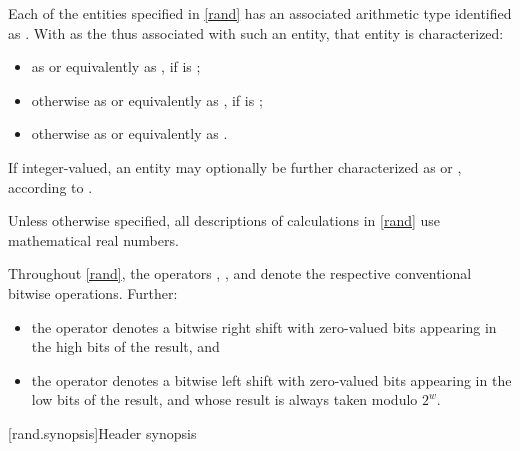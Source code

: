 \pnum
Each of the entities specified in \ref{rand}
has an associated arithmetic type
identified as .
With  as the 
thus associated with such an entity,
that entity is characterized:
\begin{itemize}
 \item
   as  or equivalently as ,
   if  is ;
 \item
   otherwise
   as  or equivalently as ,
   if  is ;
 \item
   otherwise
   as  or equivalently as .
\end{itemize}
\noindent
If integer-valued,
an entity may optionally be further characterized as
 or ,
according to .

\pnum
Unless otherwise specified,
all descriptions of calculations
in \ref{rand}
use mathematical real numbers.

\pnum
Throughout \ref{rand},
the operators
\bitand, \bitor, and \xor{}
denote the respective conventional bitwise operations.
Further:
\begin{itemize}
 \item
   the operator \rightshift{} denotes a bitwise right shift
   with zero-valued bits appearing in the high bits of the result, and
 \item
   the operator  denotes a bitwise left shift
   with zero-valued bits appearing in the low bits of the result,
   and whose result is always taken modulo $2^w$.
\end{itemize}




[rand.synopsis]{Header  synopsis}


